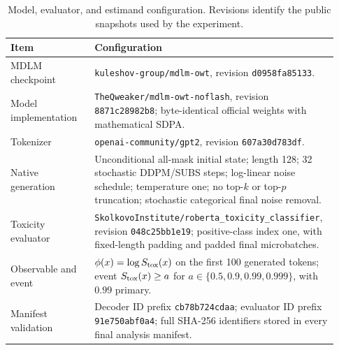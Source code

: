 \documentclass{article}
\begin{document}
\begin{table}[ht]
\caption{Model, evaluator, and estimand configuration. Revisions identify the
public snapshots used by the experiment.}
\label{tab:repro-model}
\centering
\small
\begin{tabular}{p{0.25\linewidth}p{0.68\linewidth}}
\toprule
Item & Configuration \\
\midrule
MDLM checkpoint & \texttt{kuleshov-group/mdlm-owt}, revision
\texttt{d0958fa85133}. \\
Model implementation & \texttt{TheQweaker/mdlm-owt-noflash}, revision
\texttt{8871c28982b8}; byte-identical official
weights with mathematical SDPA. \\
Tokenizer & \texttt{openai-community/gpt2}, revision
\texttt{607a30d783df}. \\
Native generation & Unconditional all-mask initial state; length 128; 32
stochastic DDPM/SUBS steps; log-linear noise schedule; temperature one; no
top-$k$ or top-$p$ truncation; stochastic categorical final noise removal. \\
Toxicity evaluator & \texttt{SkolkovoInstitute/roberta\_toxicity\_classifier},
revision \texttt{048c25bb1e19}; positive-class
index one, with fixed-length padding and padded final microbatches. \\
Observable and event & $\phi(x)=\log S_{\rm tox}(x)$ on the first 100 generated
tokens; event $S_{\rm tox}(x)\geq a$ for
$a\in\{0.5,0.9,0.99,0.999\}$, with $0.99$ primary. \\
Manifest validation & Decoder ID prefix \texttt{cb78b724cdaa}; evaluator ID
prefix \texttt{91e750abf0a4}; full SHA-256 identifiers stored in every final
analysis manifest. \\
\bottomrule
\end{tabular}
\end{table}
\end{document}
